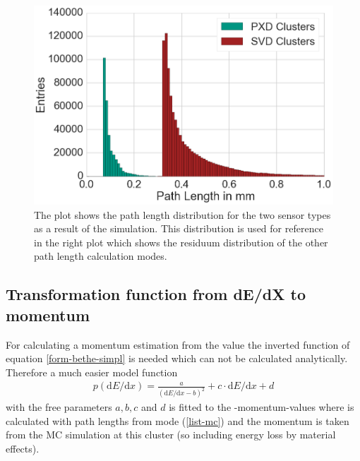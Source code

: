\begin{figure}
 \centering
 \includegraphics[width=0.7\linewidth]{figures/vxd/pathLengths.png}
 \caption[Path length distribution for the two sensor types.]{The plot shows the path length distribution for the two sensor types as a result of the simulation. This distribution is used for reference in the right plot which shows the residuum distribution of the other path length calculation modes.}
 \label{fig-pathlengths}
\end{figure}

\subsection{Transformation function from dE/dX to momentum} \label{subsection-transform}

For calculating a momentum estimation from the \dedx value the inverted function of equation \ref{form-bethe-simpl} is needed which can not be calculated analytically. Therefore a much easier model function
\begin{align}
 p(\mathrm{d}E/\mathrm{d} x) = \frac{a}{(\mathrm{d}E/\mathrm{d} x - b)^2} + c \cdot \mathrm{d}E/\mathrm{d} x + d \label{form-model}
\end{align}
with the free parameters $a, b, c$ and $d$ is fitted to the \dedx-momentum-values where \dedx is calculated with path lengths from mode (\ref{list-mc}) and the momentum is taken from the MC simulation at this cluster (so including energy loss by material effects).

